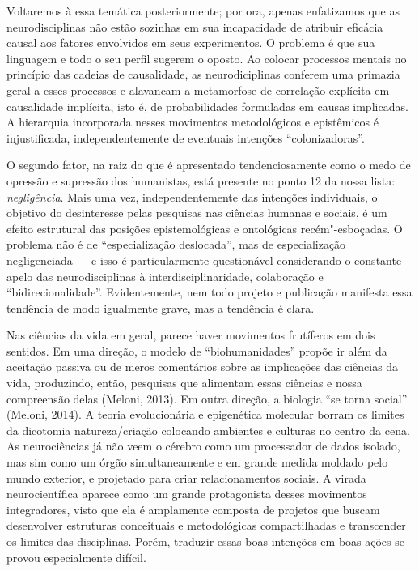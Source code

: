 Voltaremos à essa temática posteriormente; por ora, apenas enfatizamos
que as neurodisciplinas não estão sozinhas em sua incapacidade de
atribuir eficácia causal aos fatores envolvidos em seus experimentos. O
problema é que sua linguagem e todo o seu perfil sugerem o oposto. Ao
colocar processos mentais no princípio das cadeias de causalidade, as
neurodiciplinas conferem uma primazia geral a esses processos e
alavancam a metamorfose de correlação explícita em causalidade
implícita, isto é, de probabilidades formuladas em causas implicadas. A
hierarquia incorporada nesses movimentos metodológicos e epistêmicos é
injustificada, independentemente de eventuais intenções
``colonizadoras''.

O segundo fator, na raiz do que é apresentado tendenciosamente como o
medo de opressão e supressão dos humanistas, está presente no ponto 12
da nossa lista: \emph{negligência}. Mais uma vez, independentemente das
intenções individuais, o objetivo do desinteresse pelas pesquisas nas
ciências humanas e sociais, é um efeito estrutural das posições
epistemológicas e ontológicas recém"-esboçadas. O problema não é de
``especialização deslocada'', mas de especialização negligenciada --- e
isso é particularmente questionável considerando o constante apelo das
neurodisciplinas à interdisciplinaridade, colaboração e
``bidirecionalidade''. Evidentemente, nem todo projeto e publicação
manifesta essa tendência de modo igualmente grave, mas a tendência é
clara.

Nas ciências da vida em geral, parece haver movimentos frutíferos em
dois sentidos. Em uma direção, o modelo de ``biohumanidades'' propõe ir
além da aceitação passiva ou de meros comentários sobre as implicações
das ciências da vida, produzindo, então, pesquisas que alimentam essas
ciências e nossa compreensão delas (Meloni, 2013). Em outra direção, a
biologia ``se torna social'' (Meloni, 2014). A teoria evolucionária e
epigenética molecular borram os limites da dicotomia natureza/criação
colocando ambientes e culturas no centro da cena. As neurociências já
não veem o cérebro como um processador de dados isolado, mas sim como um
órgão simultaneamente e em grande medida moldado pelo mundo exterior, e
projetado para criar relacionamentos sociais. A virada neurocientífica
aparece como um grande protagonista desses movimentos integradores,
visto que ela é amplamente composta de projetos que buscam desenvolver
estruturas conceituais e metodológicas compartilhadas e transcender os
limites das disciplinas. Porém, traduzir essas boas intenções em boas
ações se provou especialmente difícil.


